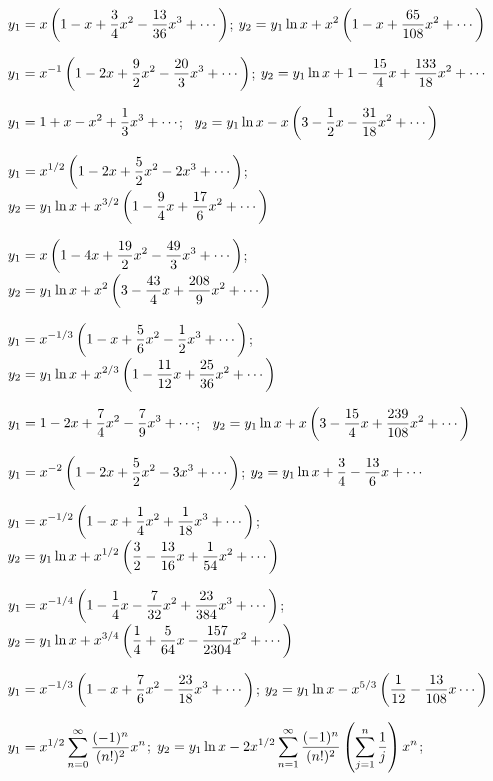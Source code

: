 \medskip

$\displaystyle{y_{1}=x\left(1-x+\frac{3}{4}x^{2}-\frac{13}{36}x^{3}+\cdots\right)}$;\;
$\displaystyle{y_{2}=y_{1}\ln x+x^{2}\left(1-x+\frac{65}{108}x^{2}+
\cdots\right)}$

$\displaystyle{y_{1}=x^{-1}\left(1-2x+\frac{9}{2}x^{2}-\frac{20}{3}x^{3}+\cdots\right)}$;\;
$\displaystyle{y_{2}=
y_{1}\ln x+1-\frac{15}{4}x+\frac{133}{18}x^{2}+\cdots}$

$\displaystyle{y_{1}=1+x-x^{2}+\frac{1}{3}x^{3}+\cdots}$;\;  \,
$\displaystyle{y_{2}=
y_{1}\ln x-x\left(3-\frac{1}{2}x-\frac{31}{18}x^{2}+\cdots\right)}$

$\displaystyle{y_{1}=x^{1/2}\left(1-2x+\frac{5}{2}x^{2}-2x^{3}+\cdots\right)}$;\;
$\displaystyle{y_{2}=
y_{1}\ln x+x^{3/2}\left(1-\frac{9}{4}x+\frac{17}{6}x^{2}+
\cdots\right)}$

$\displaystyle{y_{1}=x\left(1-4x+\frac{19}{2}x^{2}-\frac{49}{3}x^{3}+\cdots\right)}$;\;
$\displaystyle{y_{2}=
y_{1}\ln x+x^{2}\left(3-\frac{43}{4}x+\frac{208}{9}x^{2}+\cdots
\right)}$

$\displaystyle{y_{1}=x^{-1/3}\left(1-x+\frac{5}{6}x^{2}-\frac{1}{2}x^{3}+\cdots\right)}$;\;
$\displaystyle{y_{2}=
y_{1}\ln x+x^{2/3}\left(1-\frac{11}{12}x+\frac{25}{36}x^{2}+
\cdots\right)}$

$\displaystyle{y_{1}=1-2x+\frac{7}{4}x^{2}-\frac{7}{9}x^{3}+\cdots}$;\;   \,
$\displaystyle{y_{2}=
y_{1}\ln x+x\left(3-\frac{15}{4}x+\frac{239}{108}x^{2}+\cdots
\right)}$

$\displaystyle{y_{1}=x^{-2}\left(1-2x+\frac{5}{2}x^{2}-3x^{3}+\cdots\right)}$;\;
$\displaystyle{y_{2}=y_{1}\ln x+\frac{3}{4}-\frac{13}{6}x+\cdots}$

$\displaystyle{y_{1}=x^{-1/2}\left(1-x+\frac{1}{4}x^{2}+\frac{1}{18}x^{3}+\cdots\right)}$;\;
$\displaystyle{y_{2}=y_{1}\ln x+x^{1/2}\left(\frac{3}{2}-\frac{13}{16}x
+\frac{1}{54}x^{2}+\cdots\right)}$

$\displaystyle{y_{1}=x^{-1/4}\left(1-\frac{1}{4}x-\frac{7}{32}x^{2}+\frac{23}{384}x^{3}
+\cdots\right)}$;\;
$\displaystyle{y_{2}=
y_{1}\ln x+x^{3/4}\left(\frac{1}{4}+\frac{5}{64}x-\frac{157}{2304}x^{2}
+\cdots\right)}$

$\displaystyle{y_{1}=x^{-1/3}\left(1-x+\frac{7}{6}x^{2}-\frac{23}{18}x^{3}+\cdots\right)}$;\;
$\displaystyle{y_{2}=
y_{1}\ln x-x^{5/3}\left(\frac{1}{12}-\frac{13}{108}x\cdots\right)}$

$\displaystyle{y_{1}=x^{1/2}\sum_{n=0}^{\infty}\frac{(-1)^{n}}{(n!)^{2}}x^{n}}$;\;
$\displaystyle{y_{2}=y_{1}\ln x-2x^{1/2}\sum_{n=1}^{\infty}
\frac{(-1)^{n}}{(n!)^{2}}\left(\sum_{j=1}^{n}\frac{1}{j}\right)x^{n}}$;\;

